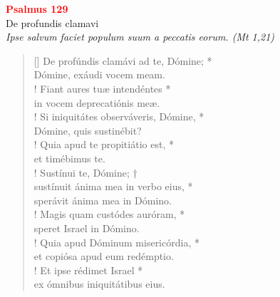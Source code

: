


\def\greinitialformat#1{%
{\fontsize{39}{39}\selectfont #1}%
}




\vspace{0.3cm}
\begin{center}
 \textcolor{red}{\large \bf Psalmus 129}\\
De profundis clamavi\\
\textit{\small Ipse salvum faciet populum suum a peccatis eorum. (Mt 1,21)}
\end{center}
\begin{verse}[\versewidth]
De profúndis clamávi ad te, Dómine; *\\
Dómine, exáudi vocem meam.\\!
\vin Fiant aures tuæ intendéntes *\\
\vin in vocem deprecatiónis meæ.\\!
Si iniquitátes observáveris, Dómine, *\\
Dómine, quis sustinébit?\\!
\vin Quia apud te propitiátio est, *\\
\vin et timébimus te.\\!
Sustínui te, Dómine; †\\
sustínuit ánima mea in verbo eius, *\\
sperávit ánima mea in Dómino.\\!
\vin Magis quam custódes auróram, *\\
\vin speret Israel in Dómino.\\!
Quia apud Dóminum misericórdia, *\\
et copiósa apud eum redémptio.\\!
\vin Et ipse rédimet Israel *\\
\vin ex ómnibus iniquitátibus eius.\\
\end{verse}
\vspace{1cm}


